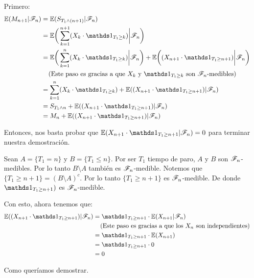 \begin{itemize}
			Primero:
			\begin{align}
				\E(M_{n+1} | \F_{n})    &=  \E( S_{T_1 \wedge (n+1)} | \F_{n})                                                          \\
                                        &=  \E\bigg( \sum_{k=1}^{n+1} (X_k \cdot \indic_{T_1 \geq k})\bigg| \F_{n}\bigg)                \\	 			
                                        &=  \E\bigg( \sum_{k=1}^{n} (X_k \cdot \indic_{T_1 \geq k}) \bigg| \F_{n}\bigg) +
                                            \E\bigg((X_{n+1} \cdot \indic_{T_1 \geq n+1}) \bigg| \F_{n}\bigg)                           \\
                                        &\;\;\;\;\mbox{(Este paso es gracias a que $X_k$ y $\indic_{T_1 \geq k}$ son $\F_n$-medibles)}  \\
                                        &=  \sum_{k=1}^{n} (X_k \cdot \indic_{T_1 \geq k}) + 
                                            \E((X_{n+1} \cdot \indic_{T_1 \geq n+1}) | \F_{n})                                          \\
                                        &=  S_{T_1 \wedge n} + \E((X_{n+1} \cdot \indic_{T_1 \geq n+1}) | \F_{n})                       \\
                                        &=  M_n + \E((X_{n+1} \cdot \indic_{T_1 \geq n+1}) | \F_{n})
			\end{align}
			
			Entonces, nos basta probar que $\E(X_{n+1} \cdot \indic_{T_1 \geq n+1} |
			 \F_{n}) = 0$ para terminar nuestra demostración.\par\null
			 
			Sean $A = \{T_1 = n\}$ y $B = \{ T_1 \leq n\}$. Por ser $T_1$ tiempo de paro,
			$A$ y $B$ son $\mathscr{F}_n$-medibles. Por lo tanto $B \setminus A$ también es $\mathscr{F}_n$-medible. 
			Notemos que $\{T_1 \geq n+1\} = (B \setminus A)^c$. Por lo tanto $\{T_1 \geq n+1\}$ es
			$\mathscr{F}_n$-medible. De donde  $\indic_{T_1 \geq n+1})$ es $\mathscr{F}_n$-medible.\par\null
			
			Con esto, ahora tenemos que:
			\begin{align}
				\E((X_{n+1} \cdot \indic_{T_1 \geq n+1}) | \F_{n})  &=  \indic_{T_1 \geq n+1} \cdot \E(X_{n+1} | \F_{n})                        \\
                                                                    &\;\;\;\;\mbox{(Este paso es gracias a que los $X_n$ son independientes)}   \\
                                                                    &=  \indic_{T_1 \geq n+1} \cdot \E(X_{n+1} )                                \\
                                                                    &=  \indic_{T_1 \geq n+1} \cdot 0                                           \\
                                                                    &=  0
			\end{align}	\par\null
			
			Como queríamos demostrar.
	\end{itemize}
	
